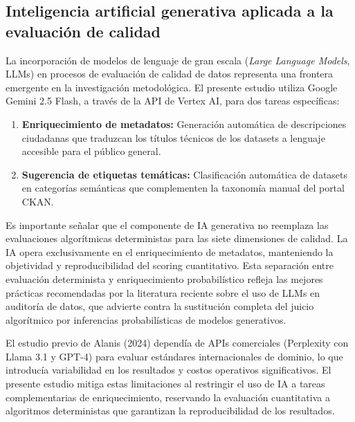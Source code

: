 \documentclass[12pt,letterpaper]{article}
\begin{document}
\subsection{Inteligencia artificial generativa aplicada a la evaluación de calidad}

La incorporación de modelos de lenguaje de gran escala (\textit{Large Language Models}, LLMs) en procesos de evaluación de calidad de datos representa una frontera emergente en la investigación metodológica. El presente estudio utiliza Google Gemini 2.5 Flash, a través de la API de Vertex AI, para dos tareas específicas:

\begin{enumerate}
  \item \textbf{Enriquecimiento de metadatos:} Generación automática de descripciones ciudadanas que traduzcan los títulos técnicos de los datasets a lenguaje accesible para el público general.

  \item \textbf{Sugerencia de etiquetas temáticas:} Clasificación automática de datasets en categorías semánticas que complementen la taxonomía manual del portal CKAN.
\end{enumerate}

Es importante señalar que el componente de IA generativa no reemplaza las evaluaciones algorítmicas deterministas para las siete dimensiones de calidad. La IA opera exclusivamente en el enriquecimiento de metadatos, manteniendo la objetividad y reproducibilidad del scoring cuantitativo. Esta separación entre evaluación determinista y enriquecimiento probabilístico refleja las mejores prácticas recomendadas por la literatura reciente sobre el uso de LLMs en auditoría de datos, que advierte contra la sustitución completa del juicio algorítmico por inferencias probabilísticas de modelos generativos.

El estudio previo de Alanis (2024) dependía de APIs comerciales (Perplexity con Llama 3.1 y GPT-4) para evaluar estándares internacionales de dominio, lo que introducía variabilidad en los resultados y costos operativos significativos. El presente estudio mitiga estas limitaciones al restringir el uso de IA a tareas complementarias de enriquecimiento, reservando la evaluación cuantitativa a algoritmos deterministas que garantizan la reproducibilidad de los resultados.

\end{document}
